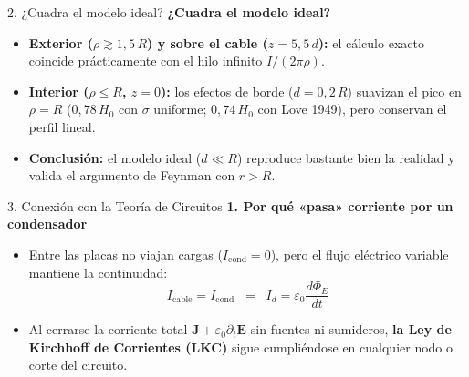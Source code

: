 \documentclass[aspectratio=43, 11pt]{beamer}
\begin{document}
\begin{frame}{2. ¿Cuadra el modelo ideal?}
      \textbf{\color{accentblue}¿Cuadra el modelo ideal?}
      \vspace{0.15cm}
      \begin{itemize}
        \item \textbf{Exterior ($\rho \gtrsim 1{,}5\,R$) y sobre el cable ($z = 5{,}5\,d$):} el cálculo exacto coincide prácticamente con el hilo infinito $I/(2\pi\rho)$.
        \vspace{0.15cm}
        \item \textbf{Interior ($\rho \le R$, $z = 0$):} los efectos de borde ($d = 0{,}2\,R$) suavizan el pico en $\rho = R$ ($0{,}78\,H_0$ con $\sigma$ uniforme; $0{,}74\,H_0$ con Love 1949), pero conservan el perfil lineal.
        \vspace{0.15cm}
        \item \textbf{Conclusión:} el modelo ideal ($d \ll R$) reproduce \alert{bastante bien} la realidad y valida el argumento de Feynman con $r > R$.
      \end{itemize}
\end{frame}

\begin{frame}{3. Conexión con la Teoría de Circuitos}
      \textbf{\color{accentblue}1. Por qué «pasa» corriente por un condensador}
      \vspace{0.15cm}
      \begin{itemize}
        \item Entre las placas no viajan cargas ($I_{\mathrm{cond}} = 0$), pero el flujo eléctrico variable mantiene la continuidad:
        \[
          I_{\mathrm{cable}} = I_{\mathrm{cond}} \;\;=\;\; I_d = \varepsilon_0 \frac{d\Phi_E}{dt}
        \]
        \item Al cerrarse la corriente total $\mathbf{J} + \varepsilon_0 \partial_t\mathbf{E}$ sin fuentes ni sumideros, \textbf{la Ley de Kirchhoff de Corrientes (LKC)} sigue cumpliéndose en cualquier nodo o corte del circuito.
      \end{itemize}
\end{frame}
\end{document}

